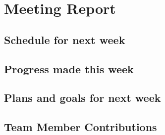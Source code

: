 \documentclass[12pt]{article}
\begin{document}
\section{Meeting Report}
\subsection{Schedule for next week}

\subsection{Progress made this week}

\subsection{Plans and goals for next week}

\subsection{Team Member Contributions}
\end{document}
